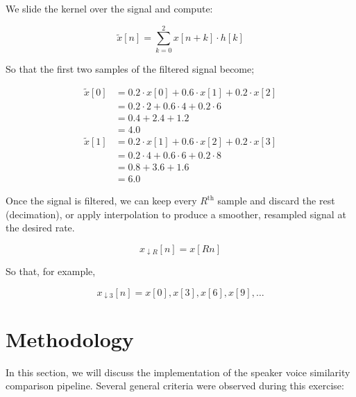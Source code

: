\documentclass[conference]{IEEEtran}
\begin{document}
	We slide the kernel over the signal and compute:
	
	$$\tilde{x}[n] = \sum_{k=0}^{2} x[n + k] \cdot h[k]$$
	
	So that the first two samples of the filtered signal become;
	
	\begin{align*}
		\tilde{x}[0]	&= 0.2 \cdot x[0] + 0.6 \cdot x[1] + 0.2 \cdot x[2] \\
		&= 0.2\cdot2 + 0.6\cdot4 + 0.2\cdot6 \\
		&= 0.4 + 2.4 + 1.2 \\
		&= 4.0\\
		\tilde{x}[1] 	&= 0.2 \cdot x[1] + 0.6 \cdot x[2] + 0.2 \cdot x[3] \\
		&= 0.2\cdot4 + 0.6\cdot6 + 0.2\cdot8 \\
		&= 0.8 + 3.6 + 1.6 \\
		&= 6.0
	\end{align*}
	
	Once the signal is filtered, we can keep every $R^\text{th}$ sample and discard the rest (decimation), or apply interpolation to produce a smoother, resampled signal at the desired rate.
	
	$$x_{\downarrow R}[n] = x[Rn]$$
	
	So that, for example,
	
	$$x_{\downarrow 3}[n] = x[0], x[3], x[6], x[9], \dots$$
	
	\section{Methodology}
	
	In this section, we will discuss the implementation of the speaker voice similarity comparison pipeline. Several general criteria were observed during this exercise:
	
\end{document}
